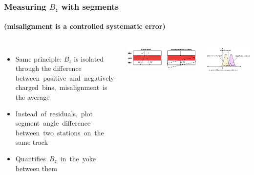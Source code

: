 \documentclass[compress]{beamer}
\begin{document}
\begin{frame}
\frametitle{Measuring $B_z$ with segments}
\framesubtitle{(misalignment is a controlled systematic error)}

\vspace{0.5 cm}
\begin{columns}
\begin{itemize}
\item Same principle: $B_z$ is isolated through the difference \mbox{between positive and negatively-\hspace{-3 cm}} \\ \mbox{charged bins, misalignment is\hspace{-3 cm}} \\ the average
\item \mbox{Instead of residuals, plot\hspace{-3 cm}} \\ \mbox{segment angle difference\hspace{-3 cm}} \\ \mbox{between two stations on the\hspace{-3 cm}} \\ same track
\item \mbox{Quantifies $B_z$ in the yoke\hspace{-3 cm}} \\ between them
\end{itemize}

\includegraphics[width=\linewidth]{angular_diagram.png}

\vspace{1 cm}
\hfill \includegraphics[width=0.75\linewidth]{angular_difference_plot.png}

\vspace{1 cm}
\end{columns}
\end{frame}
\end{document}
